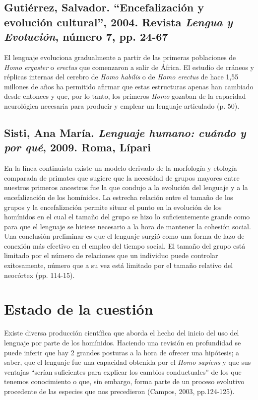 \documentclass[12pt, a4paper, oneside]{report}
\begin{document}
                \subsection*{Gutiérrez, Salvador. “Encefalización y evolución cultural”, 2004. Revista
                \textit{Lengua y Evolución}, número 7, pp. 24-67}
                    El lenguaje evoluciona gradualmente a partir de las primeras poblaciones de
                    \emph{Homo ergaster} o \emph{erectus} que comenzaron a salir de África. El estudio de
                    cráneos y réplicas internas del cerebro de \emph{Homo habilis} o de
                    \emph{Homo erectus} de hace 1,55 millones de años ha permitido afirmar que estas
                    estructuras apenas han cambiado desde entonces y que, por lo tanto, los primeros
                    \emph{Homo} gozaban de la capacidad neurológica necesaria para producir y emplear un
                    lenguaje articulado (p. 50).

                \subsection*{Sisti, Ana María. \textit{Lenguaje humano: cuándo y por qué}, 2009. Roma, Lípari}
                    En la línea continuista existe un modelo derivado de la morfología y etología comparada de
                    primates que sugiere que la necesidad de grupos mayores entre nuestros primeros ancestros
                    fue la que condujo a la evolución del lenguaje y a la encefalización de los homínidos. La
                    estrecha relación entre el tamaño de los grupos y la encefalización permite situar el
                    punto en la evolución de los homínidos en el cual el tamaño del grupo se hizo lo
                    suficientemente grande como para que el lenguaje se hiciese necesario a la hora de
                    mantener la cohesión social. Una conclusión preliminar es que el lenguaje surgió como una
                    forma de lazo de conexión más efectivo en el empleo del tiempo social. El tamaño del grupo
                    está limitado por el número de relaciones que un individuo puede controlar exitosamente,
                    número que a su vez está limitado por el tamaño relativo del neocórtex (pp. 114-15).
                    \clearpage

        \section{Estado de la cuestión}
            Existe diversa producción científica que aborda el hecho del inicio del uso del lenguaje por
            parte de los homínidos. Haciendo una revisión en profundidad se puede inferir que hay 2 grandes
            posturas a la hora de ofrecer una hipótesis; a saber, que el lenguaje fue una capacidad obtenida
            por el \emph{Homo sapiens} y que sus ventajas ``serían suficientes para explicar los cambios
            conductuales'' de los que tenemos conocimiento o que, sin embargo, forma parte de un proceso
            evolutivo procedente de las especies que nos precedieron (Campos, 2003, pp.124-125).
\end{document}
